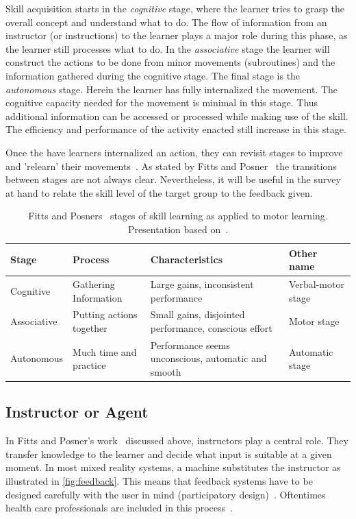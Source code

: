 Skill acquisition starts in the \emph{cognitive} stage, where the learner tries to grasp the overall concept and understand what to do. The flow of information from an instructor (or instructions) to the learner plays a major role during this phase, as the learner still processes what to do. 
In the \emph{associative} stage the learner will construct the actions to be done from minor movements (subroutines) and the information gathered during the cognitive stage.
The final stage is the \emph{autonomous} stage. Herein the learner has fully internalized the movement. The cognitive capacity needed for the movement is minimal in this stage. Thus additional information can be accessed or processed while making use of the skill. The efficiency and performance of the activity enacted still increase in this stage.

Once the have learners internalized an action, they can revisit stages to improve and 'relearn' their movements~\cite{huber2013AEP}. As stated by Fitts and Posner~\cite{fitts1967HPe} the transitions between stages are not always clear. Nevertheless, it will be useful in the survey at hand to relate the skill level of the target group to the feedback given.

\begin{table}[ht]
\caption{Fitts and Posners~\cite{fitts1967HPe} stages of skill learning as applied to motor learning. Presentation based on~\cite{huber2013AEP}.\label{table:1}}
\begin{tabular}{ |p{2.2cm}||p{2.4cm}|p{4.2cm}|p{2.2cm}|  }

 \hline
 Stage & Process & Characteristics & Other name\\
 \hline
 \hline
 Cognitive   & Gathering Information    &Large gains, inconsistent performance&   Verbal-motor stage\\
 \hline
 Associative&   Putting actions together  & Small gains, disjointed performance, conscious effort   &Motor stage\\
 \hline
 Autonomous &Much time and practice & Performance seems unconscious, automatic and smooth&  Automatic stage\\
 \hline
\end{tabular}
\label{table:stages}
\end{table}

\subsection{Instructor or Agent\label{sec:instructor}}
In Fitts and Posner's work~\cite{fitts1967HPe} discussed above, instructors play a central role. They transfer knowledge to the learner and decide what input is suitable at a given moment. In most mixed reality systems, a machine substitutes the instructor as illustrated in \autoref{fig:feedback}. This means that feedback systems have to be designed carefully with the user in mind (participatory design)~\cite{davies2003vrf}. Oftentimes health care professionals are included in this process~\cite{hilton2011dem}.

